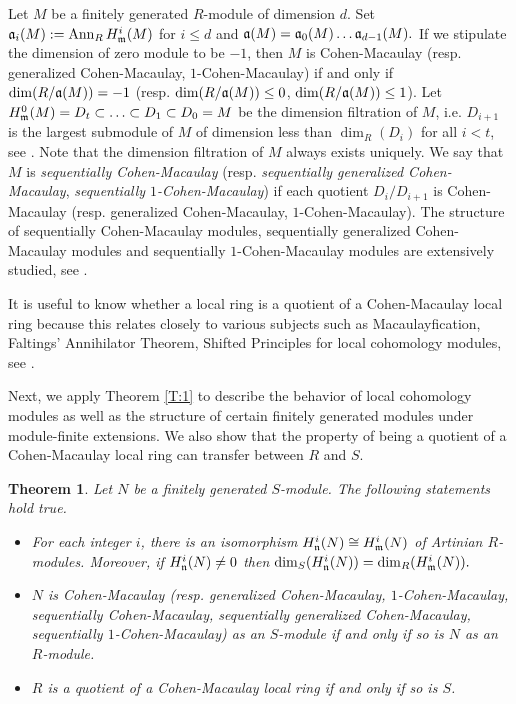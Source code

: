 \documentclass[a4papersize]{article}
\newtheorem{theorem}{Theorem}[section]
\DeclareMathOperator{\Ann}{Ann}
\begin{document}
{Let $M$ be a finitely generated $R$-module of dimension $d$. Set $\frak a_i(M):=\Ann_RH^i_{\frak m}(M)$ for $i\leq d$ and $\frak a(M)=\frak a_0(M)\ldots \frak a_{d-1}(M).$ If we stipulate the dimension of zero module to be $-1$, then $M$ is Cohen-Macaulay (resp. generalized Cohen-Macaulay, $1$-Cohen-Macaulay) if and only if $\dim (R/\frak a(M))=-1$ (resp. $\dim (R/\frak a(M))\leq 0$, $\dim (R/\frak a(M))\leq 1$). 	
Let $H^0_{\frak m}(M)=D_t\subset \ldots \subset D_1\subset D_0=M$ be the dimension filtration of $M$, i.e. $D_{i+1}$ is the largest submodule of $M$ of dimension less than $\dim_R(D_i)$ for all $i<t$, see \cite{Sch}. Note that the dimension filtration of $M$ always exists uniquely.  We say that $M$ is {\it sequentially Cohen-Macaulay} (resp. {\it sequentially generalized Cohen-Macaulay}, {\it sequentially $1$-Cohen-Macaulay}) if each quotient $D_i/D_{i+1}$ is Cohen-Macaulay (resp. generalized Cohen-Macaulay, $1$-Cohen-Macaulay).  The structure of sequentially  Cohen-Macaulay modules,  sequentially generalized Cohen-Macaulay modules and sequentially $1$-Cohen-Macaulay modules  are  extensively studied, see  \cite{CSSS, CN, CST, GN, LLN, LN, NDC, Sch, St, TPDA}. 
 	
It is useful to know whether a local ring is a quotient of a Cohen-Macaulay local ring because this relates closely to various subjects such as Macaulayfication, Faltings' Annihilator Theorem, Shifted Principles for local cohomology modules, see \cite{CC, Fa, NQ}. 
 	
Next, we apply Theorem \ref{T:1} to describe the behavior of local cohomology modules as well as the structure of certain finitely generated modules under module-finite extensions. We also show that the property of being a quotient of a Cohen-Macaulay local ring can  transfer between $R$ and $S.$ 
 		 	
\begin{theorem}\label{T:2} Let $N$ be a finitely generated $S$-module. The following statements hold true. 
\begin{itemize}			
\item [{\rm (a)}] For each integer $i$, there is an isomorphism $H^i_{\frak n}(N)\cong  H^i_{\frak m}(N)$ of Artinian $R$-modules. Moreover, if $H^i_{\frak n}(N)\neq 0$ then  
$\dim_S(H^i_{\frak n}(N))=\dim_R(H^i_{\frak m}(N)).$
\item [{\rm (b)}] $N$ is Cohen-Macaulay (resp. generalized Cohen-Macaulay, $1$-Cohen-Macaulay,  sequentially  Cohen-Macaulay, sequentially  generalized Cohen-Macaulay, sequentially  $1$-Cohen-Macaulay)  as an $S$-module if and only if so is $N$ as an $R$-module.
\item [{\rm (c)}]  $R$ is a quotient of a Cohen-Macaulay local ring if and only if so is  $S$.
\end{itemize} 		
\end{theorem}
 	
}
\end{document}
